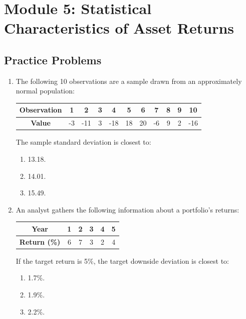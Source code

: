\newpage

\section{Module 5: Statistical Characteristics of Asset Returns}
\label{sec:app_Problems_M5}

\subsection{Practice Problems}
\label{subsec:app_Problems_M5}

\begin{enumerate}
	\item The following 10 observations are a sample drawn from an approximately normal population:
	      \begin{center}
	      \begin{tabular}{|c|c|c|c|c|c|c|c|c|c|c|}
		      \hline
		      \textbf{Observation} & 1 & 2 & 3 & 4 & 5 & 6 & 7 & 8 & 9 & 10 \\
		      \hline
		      \textbf{Value} & -3 & -11 & 3 & -18 & 18 & 20 & -6 & 9 & 2 & -16 \\
		      \hline
	      \end{tabular}
	      \end{center}
	      The sample standard deviation is closest to:
	      \begin{enumerate}[label=\Alph*.]
		      \item 13.18.
		      \item 14.01.
		      \item 15.49.
	      \end{enumerate}

	\item An analyst gathers the following information about a portfolio's returns:
	      \begin{center}
	      \begin{tabular}{|c|c|c|c|c|c|}
		      \hline
		      \textbf{Year} & 1 & 2 & 3 & 4 & 5 \\
		      \hline
		      \textbf{Return (\%)} & 6 & 7 & 3 & 2 & 4 \\
		      \hline
	      \end{tabular}
	      \end{center}
	      If the target return is 5\%, the target downside deviation is closest to:
	      \begin{enumerate}[label=\Alph*.]
		      \item 1.7\%.
		      \item 1.9\%.
		      \item 2.2\%.
	      \end{enumerate}


\end{enumerate}
